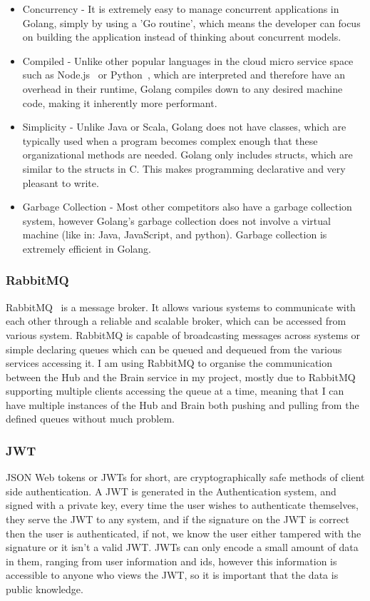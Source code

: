 \documentclass[titlepage]{article}
\begin{document}
\begin{itemize}
  \item Concurrency - It is extremely easy to manage concurrent applications in Golang, simply by using a 'Go routine', which means the developer can focus on building the application instead of thinking about concurrent models.
  \item Compiled - Unlike other popular languages in the cloud micro service space such as Node.js~\cite{nodejs} or Python~\cite{python}, which are interpreted and therefore have an overhead in their runtime, Golang compiles down to any desired machine code, making it inherently more performant.
  \item Simplicity - Unlike Java or Scala, Golang does not have classes, which are typically used when a program becomes complex enough that these organizational methods are needed. Golang only includes structs, which are similar to the structs in C. This makes programming declarative and very pleasant to write.
  \item Garbage Collection - Most other competitors also have a garbage collection system, however Golang's garbage collection does not involve a virtual machine (like in: Java, JavaScript, and python). Garbage collection is extremely efficient in Golang.
\end{itemize}

\subsubsection{RabbitMQ}
RabbitMQ~\cite{rabbitmq} is a message broker. It allows various systems to communicate with each other through a reliable and scalable broker, which can be accessed from various system. RabbitMQ is capable of broadcasting messages across systems or simple declaring queues which can be queued and dequeued from the various services accessing it. I am using RabbitMQ to organise the communication between the Hub and the Brain service in my project, mostly due to RabbitMQ supporting multiple clients accessing the queue at a time, meaning that I can have multiple instances of the Hub and Brain both pushing and pulling from the defined queues without much problem.

\subsubsection{JWT}
JSON Web tokens or JWTs for short, are cryptographically safe methods of client side authentication. A JWT is generated in the Authentication system, and signed with a private key, every time the user wishes to authenticate themselves, they serve the JWT to any system, and if the signature on the JWT is correct then the user is authenticated, if not, we know the user either tampered with the signature or it isn't a valid JWT. JWTs can only encode a small amount of data in them, ranging from user information and ids, however this information is accessible to anyone who views the JWT, so it is important that the data is public knowledge. \\
\end{document}
